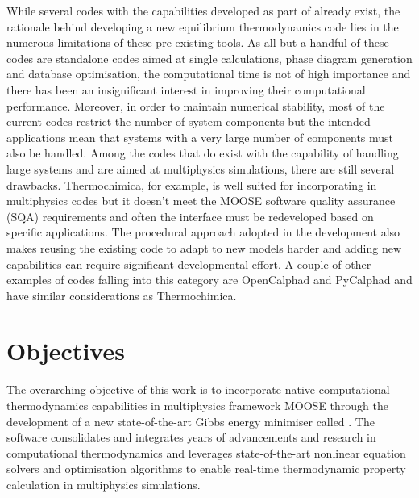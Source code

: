 	While several codes with the capabilities developed as part of {\GEM} already exist, the rationale behind developing a new equilibrium thermodynamics code lies in the numerous limitations of these pre-existing tools. As all but a handful of these codes are standalone codes aimed at single calculations, phase diagram generation and database optimisation,  the computational time is not of high importance and there has been an insignificant interest in improving their computational performance. Moreover, in order to maintain numerical stability, most of the current codes restrict the number of system components but the intended applications mean that systems with a very large number of components must also be handled. Among the codes that do exist with the capability of handling large systems and are aimed at multiphysics simulations, there are still several drawbacks. Thermochimica, for example, is well suited for incorporating in multiphysics codes but it doesn't meet the MOOSE software quality assurance (SQA) requirements and often the interface must be redeveloped based on specific applications. The procedural approach adopted in the development also makes reusing the existing code to adapt to new models harder and adding new capabilities can require significant developmental effort. A couple of other examples of codes falling into this category are OpenCalphad and PyCalphad and have similar considerations as Thermochimica.  

\section{Objectives}
	The overarching objective of this work is to incorporate native computational thermodynamics capabilities in multiphysics framework MOOSE through the development of a new state-of-the-art Gibbs energy minimiser called \GEM. The software consolidates and integrates years of advancements and research in computational thermodynamics and leverages state-of-the-art nonlinear equation solvers and optimisation algorithms to enable real-time thermodynamic property calculation in multiphysics simulations. 
	
